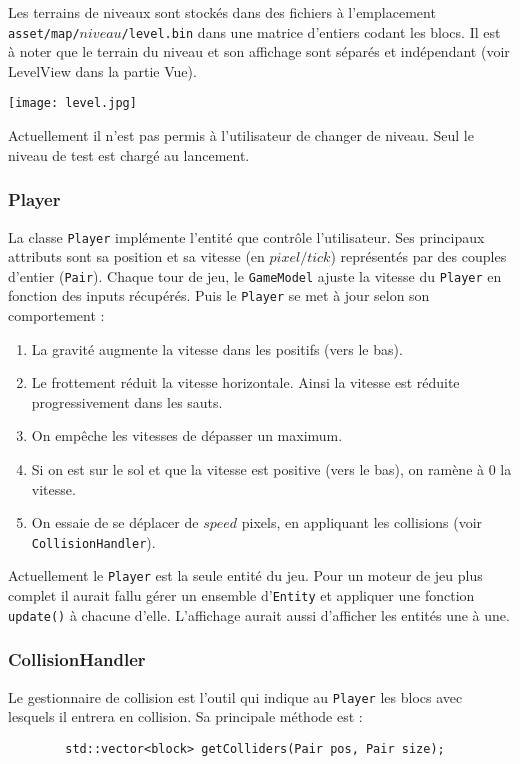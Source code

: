 \documentclass[a4paper,11pt]{article}
\begin{document}
\vspace{0.4cm}
Les terrains de niveaux sont stockés dans des fichiers à l'emplacement \texttt{asset/map/$niveau$/level.bin} dans une matrice d'entiers codant les blocs. Il est à noter que le terrain du niveau et son affichage sont séparés et indépendant (voir LevelView dans la partie Vue).

\begin{center}
\texttt{[image: level.jpg]}
\end{center}

\vspace{1cm}
Actuellement il n'est pas permis à l'utilisateur de changer de niveau. Seul le niveau de test est chargé au lancement.


\subsubsection*{Player}
La classe \texttt{Player} implémente l'entité que contrôle l'utilisateur. Ses principaux attributs sont sa position et sa vitesse (en $pixel/tick$) représentés par des couples d'entier (\texttt{Pair}). Chaque tour de jeu, le \texttt{GameModel} ajuste la vitesse du \texttt{Player} en fonction des inputs récupérés. Puis le \texttt{Player} se met à jour selon son comportement :
\begin{enumerate}
\item La gravité augmente la vitesse dans les positifs (vers le bas).
\item Le frottement réduit la vitesse horizontale. Ainsi la vitesse est réduite progressivement dans les sauts.
\item On empêche les vitesses de dépasser un maximum.
\item Si on est sur le sol et que la vitesse est positive (vers le bas), on ramène à 0 la vitesse.
\item On essaie de se déplacer de $speed$ pixels, en appliquant les collisions (voir \texttt{CollisionHandler}).
\end{enumerate}

Actuellement le \texttt{Player} est la seule entité du jeu. Pour un moteur de jeu plus complet il aurait fallu gérer un ensemble d'\texttt{Entity} et appliquer une fonction \texttt{update()} à chacune d'elle. L'affichage aurait aussi d'afficher les entités une à une.

\subsubsection*{CollisionHandler}
Le gestionnaire de collision est l'outil qui indique au \texttt{Player} les blocs avec lesquels il entrera en collision. Sa principale méthode est :
\begin{lstlisting}
        std::vector<block> getColliders(Pair pos, Pair size);
\end{lstlisting}
\end{document}

